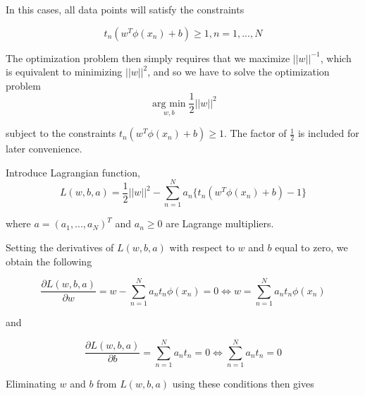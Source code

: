 In this cases, all data points will satisfy the constraints

\begin{equation}
    \label{SVM: constraint}
    t_n(w^T\phi(x_n) + b) \geq 1, n =1,...,N
\end{equation}


The optimization problem then simply requires that we maximize $||w||^{-1}$, which is equivalent to minimizing $||w||^2$, and so we have to solve the optimization problem
\begin{equation}
    \operatorname*{arg\ min}_{w, b} \frac{1}{2}||w||^2
\end{equation}                                                                                                                                                                                     

subject to the constraints $t_n(w^T\phi(x_n) + b) \geq 1$. The factor of $\frac{1}{2}$ is included for later convenience.

Introduce Lagrangian function,
\begin{equation}
    L(w, b, a) = \frac{1}{2}||w||^2 - \sum_{n=1}^N a_n\{t_n(w^T \phi(x_n) + b) - 1 \}
\end{equation}

where $a = (a_1, ..., a_N)^T$ and $a_n \geq 0$ are Lagrange multipliers.

Setting the derivatives of $L(w, b, a)$ with respect to $w$ and $b$ equal to zero, we obtain the following

\begin{equation}
    \label{eq: w and a_n}
    \frac{\partial L(w, b, a)}{\partial w} = w - \sum_{n=1}^{N}a_n t_n \phi(x_n) = 0 \Leftrightarrow w = \sum_{n=1}^{N}a_n t_n\phi(x_n)
\end{equation}

and

\begin{equation}
    \frac{\partial L(w, b, a)}{\partial b} = \sum_{n=1}^{N}a_n t_n = 0 \Leftrightarrow \sum_{n=1}^{N}a_n t_n = 0
\end{equation}

Eliminating $w$ and $b$ from $L(w, b, a)$ using these conditions then gives 

